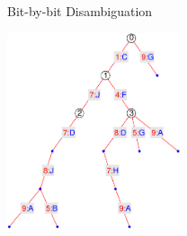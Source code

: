 \addtocounter{framenumber}{-1}
\begin{tframe}{Bit-by-bit Disambiguation}
\begin{center}
\includegraphics[width=2in]{media_minrep/cdiag23}\quad
{}
\end{center}
\end{tframe}

